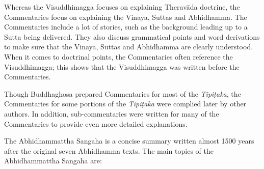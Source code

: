 Whereas the Visuddhimagga focuses on explaining Theravāda doctrine, the Commentaries focus on explaining the Vinaya, Suttas and Abhidhamma. The Commentaries include a lot of stories, such as the background leading up to a Sutta being delivered. They also discuss grammatical points and word derivations to make sure that the Vinaya, Suttas and Abhidhamma are clearly understood. When it comes to doctrinal points, the Commentaries often reference the Visuddhimagga; this shows that the Visuddhimagga was written before the Commentaries. 

Though Buddhaghosa prepared Commentaries for most of the \textit{Tipiṭaka}, the Commentaries for some portions of the \textit{Tipiṭaka} were complied later by other authors. In addition, sub-commentaries were written for many of the Commentaries to provide even more detailed explanations.


\color{red}

The Abhidhammattha Sangaha is a concise summary written almost 1500 years after the original seven Abhidhamma texts. The main topics of the Abhidhammattha Sangaha are:

